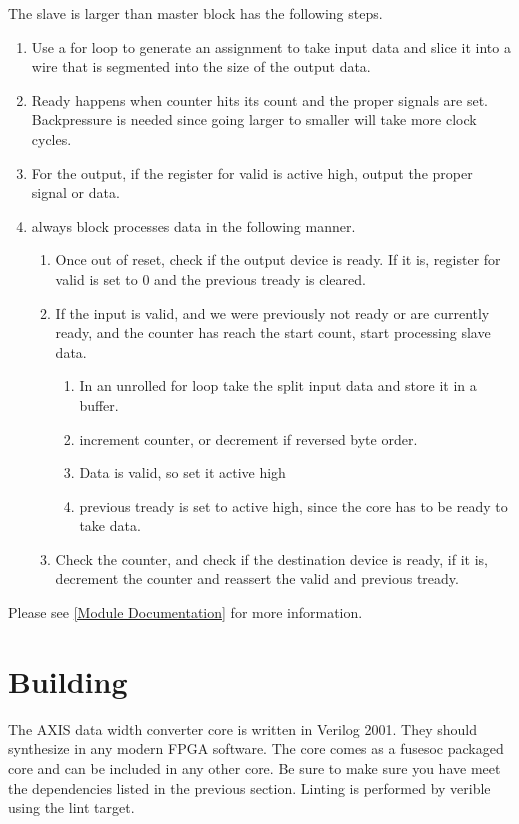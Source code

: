 \par
The slave is larger than master block has the following steps.
\begin{enumerate}
\item Use a for loop to generate an assignment to take input data and slice it into a wire that is segmented into the size of the output data.
\item Ready happens when counter hits its count and the proper signals are set. Backpressure is needed since going larger to smaller will take more clock cycles.
\item For the output, if the register for valid is active high, output the proper signal or data.
\item always block processes data in the following manner.
  \begin{enumerate}
    \item Once out of reset, check if the output device is ready. If it is, register for valid is set to 0 and the previous tready is cleared.
    \item If the input is valid, and we were previously not ready or are currently ready, and the counter has reach the start count, start processing slave data.
    \begin{enumerate}
      \item In an unrolled for loop take the split input data and store it in a buffer.
      \item increment counter, or decrement if reversed byte order.
      \item Data is valid, so set it active high
      \item previous tready is set to active high, since the core has to be ready to take data.
    \end{enumerate}
    \item Check the counter, and check if the destination device is ready, if it is, decrement the counter and reassert the valid and previous tready.
  \end{enumerate}
\end{enumerate}

Please see \ref{Module Documentation} for more information.

\section{Building}

\par
The AXIS data width converter core is written in Verilog 2001. They should synthesize in any modern FPGA software. The core comes as a fusesoc packaged core and can be included in any other core. Be sure to make sure you have meet the dependencies listed in the previous section. Linting is performed by verible using the lint target.

